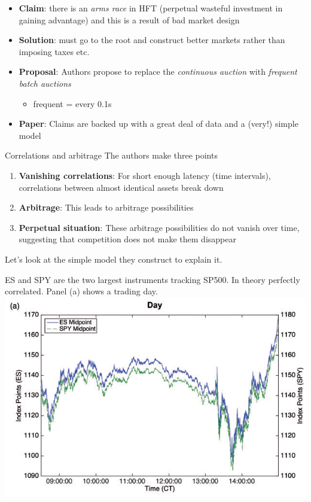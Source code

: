 \documentclass[english,10pt
,aspectratio=169
]{beamer}
\begin{document}
\begin{frame}{\citet*{budish_high-frequency_2015}}
	\begin{itemize}
		\item \textbf{Claim}: there is an \textit{arms race} in HFT (perpetual wasteful investment in gaining advantage) and this is a result of bad market design
		\item \textbf{Solution}: must go to the root and construct better markets rather than imposing taxes etc.
		\item \textbf{Proposal}: Authors propose to replace the \textit{continuous auction} with \textit{frequent batch auctions}
		\begin{itemize}
			\item frequent = every 0.1s
		\end{itemize}
		\item \textbf{Paper}: Claims are backed up with a great deal of data and a (very!) simple model
	\end{itemize}
\end{frame}


\begin{frame}{Correlations and arbitrage}
	The authors make three points
	\begin{enumerate}
		\item \textbf{Vanishing correlations}: For short enough latency (time intervals), correlations between almost identical assets break down
		\item \textbf{Arbitrage}: This leads to arbitrage possibilities
		\item \textbf{Perpetual situation}: These arbitrage possibilities do not vanish over time, suggesting that competition does not make them disappear
	\end{enumerate}
	Let's look at the simple model they construct to explain it.
\end{frame}


\begin{frame}[noframenumbering]{\citet*{budish_high-frequency_2015}}
	ES and SPY are the two largest instruments tracking SP500. In theory perfectly correlated. Panel (a) shows a trading day.
	\center
	\includegraphics[scale=0.7]{pics/HTF_Corr_1}
\end{frame}
\end{document}
